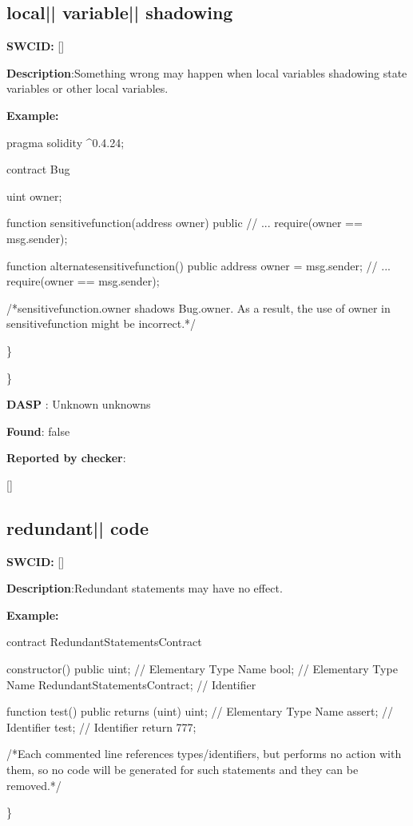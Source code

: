 \documentclass{article}
\begin{document}
\subsection{local{|\textunderscore| }variable{|\textunderscore| }shadowing} 
\textbf{SWC{\textunderscore }ID:} []

\textbf{Description}:Something wrong may happen when local variables shadowing state variables or other local variables.


\textbf{Example:} 
\begin{ffcode} 

pragma solidity ^0.4.24;

contract Bug {
    uint owner;

    function sensitive\textunderscore function(address owner) public {
        // ...
        require(owner == msg.sender);
    }

    function alternate\textunderscore sensitive\textunderscore function() public {
        address owner = msg.sender;
        // ...
        require(owner == msg.sender);
    }
}

 /*sensitive\textunderscore function.owner shadows Bug.owner. As a result, the use of owner in sensitive\textunderscore function might be incorrect.*/ 

\end{ffcode} 
\} 

\} 

\textbf{DASP} : Unknown unknowns

\textbf{Found}: false

\textbf{Reported by checker}: 
\begin{ffcode} 

[]
\end{ffcode} 
\subsection{redundant{|\textunderscore| }code} 
\textbf{SWC{\textunderscore }ID:} []

\textbf{Description}:Redundant statements may have no effect.


\textbf{Example:} 
\begin{ffcode} 

contract RedundantStatementsContract {

    constructor() public {
        uint; // Elementary Type Name
        bool; // Elementary Type Name
        RedundantStatementsContract; // Identifier
    }

    function test() public returns (uint) {
        uint; // Elementary Type Name
        assert; // Identifier
        test; // Identifier
        return 777;
    }
}

 /*Each commented line references types/identifiers, but performs no action with them, so no code will be generated for such statements and they can be removed.*/ 

\end{ffcode} 
\} 
\end{document}
